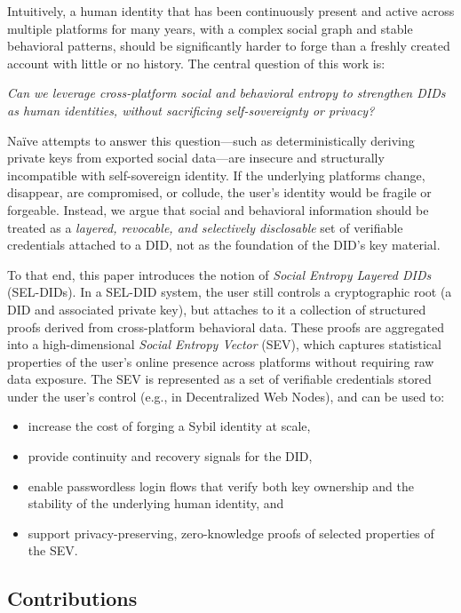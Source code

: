 \documentclass[11pt]{article}
\begin{document}
Intuitively, a human identity that has been continuously present and active across multiple platforms for many years, with a complex social graph and stable behavioral patterns, should be significantly harder to forge than a freshly created account with little or no history. The central question of this work is:

\medskip
\emph{Can we leverage cross-platform social and behavioral entropy to strengthen DIDs as human identities, without sacrificing self-sovereignty or privacy?}
\medskip

Naïve attempts to answer this question---such as deterministically deriving private keys from exported social data---are insecure and structurally incompatible with self-sovereign identity. If the underlying platforms change, disappear, are compromised, or collude, the user's identity would be fragile or forgeable. Instead, we argue that social and behavioral information should be treated as a \emph{layered, revocable, and selectively disclosable} set of verifiable credentials attached to a DID, not as the foundation of the DID's key material.

To that end, this paper introduces the notion of \emph{Social Entropy Layered DIDs} (SEL-DIDs). In a SEL-DID system, the user still controls a cryptographic root (a DID and associated private key), but attaches to it a collection of structured proofs derived from cross-platform behavioral data. These proofs are aggregated into a high-dimensional \emph{Social Entropy Vector} (SEV), which captures statistical properties of the user's online presence across platforms without requiring raw data exposure. The SEV is represented as a set of verifiable credentials stored under the user's control (e.g., in Decentralized Web Nodes), and can be used to:

\begin{itemize}
  \item increase the cost of forging a Sybil identity at scale,
  \item provide continuity and recovery signals for the DID,
  \item enable passwordless login flows that verify both key ownership and the stability of the underlying human identity, and
  \item support privacy-preserving, zero-knowledge proofs of selected properties of the SEV.
\end{itemize}

\subsection{Contributions}
\end{document}
